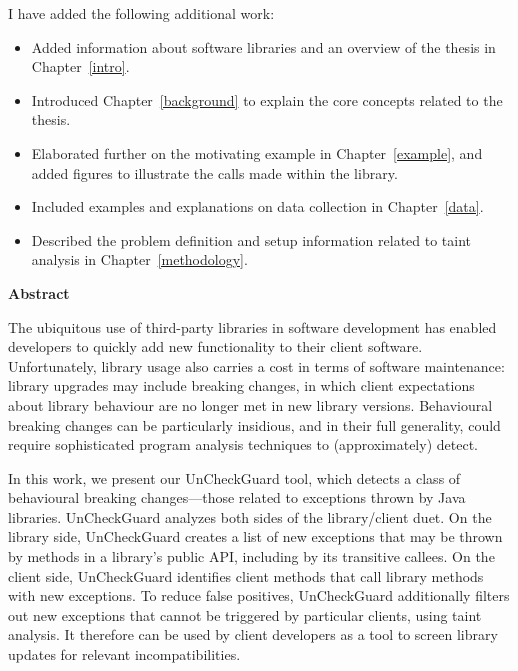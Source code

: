 I have added the following additional work:

\begin{itemize}
  \item Added information about software libraries and an overview of the thesis in Chapter~\ref{intro}.
  \item Introduced Chapter~\ref{background} to explain the core concepts related to the thesis.
  \item Elaborated further on the motivating example in Chapter~\ref{example}, and added figures to illustrate the calls made within the library.
  \item Included examples and explanations on data collection in Chapter~\ref{data}.
  \item Described the problem definition and setup information related to taint analysis in Chapter~\ref{methodology}.
\end{itemize}

\cleardoublepage
{}    %

\begin{center}\textbf{Abstract}\end{center}

      The ubiquitous use of third-party libraries in software development has enabled developers to quickly add
      new functionality to their client software. Unfortunately, library usage also carries a cost in
      terms of software maintenance: library upgrades may include breaking changes, in which client expectations
      about library behaviour are no longer met in new library versions. Behavioural breaking
      changes can be particularly insidious, and in their full generality, could require sophisticated program
      analysis techniques to (approximately) detect.

      In this work, we present our UnCheckGuard tool, which detects a class of behavioural breaking changes---those
      related to exceptions thrown by Java libraries. UnCheckGuard analyzes both sides of the library/client
      duet. On the library side, UnCheckGuard creates a list of new exceptions that may be thrown by methods
      in a library's public API, including by its transitive callees. On the client side, UnCheckGuard identifies
      client methods that call library methods with new exceptions. To reduce false positives, UnCheckGuard
      additionally filters out new exceptions that cannot be triggered by particular clients, using taint analysis. It therefore can be
      used by client developers as a tool to screen library updates for relevant incompatibilities.

